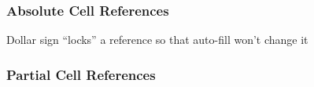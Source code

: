 \documentclass[color=usenames,dvipsnames]{beamer}\usepackage[]{graphicx}\usepackage[]{color}
\begin{document}
\begin{frame}
  \frametitle{Absolute Cell References}
  \begin{center}
    Dollar sign ``locks'' a reference so that auto-fill won't change it
  \end{center}
\end{frame}


\begin{frame}
  \frametitle{Partial Cell References}
\end{frame}
\end{document}
